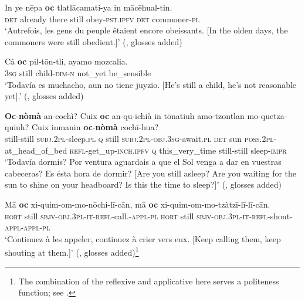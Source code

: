 \begin{exe}
	\ex\label{exAppendixClassicalNahuatl1}
	\gll In ye nēpa \textbf{oc} tlatlācamati-ya in mācēhual-tin.\\
	\textsc{det} already there still obey-\textsc{pst}.\textsc{ipfv} \textsc{det} commoner-\textsc{pl}\\
	\glt \lq Autrefois, les gens du peuple êtaient encore obeissants. [In the olden days, the commoners were still obedient.]\rq{ }(\cite[1262]{Launey1986}, glosses added)

	\ex\label{exAppendixClassicalNahuatl2}
	\gll Câ \textbf{oc} pil-tōn-tli, ayamo mozcalia.\\
	3\textsc{sg} still child-\textsc{dim}-\textsc{n} not\_yet be\_sensible\\
	\glt \lq Todavía es muchacho, aun no tiene juyzio. [He's still a child, he's not reasonable yet].' (\cite[501]{Carochi1645}, glosses added)

	\ex\label{exAppendixClassicalNahuatl3}
	\gll \textbf{Oc}-\textbf{nòmà} an-cochì? Cuix \textbf{oc} an-qu-ichià in tōnatiuh amo-tzontlan mo-quetza-quiuh? Cuix inmanin \textbf{oc}-\textbf{nòmà} cochī-hua?\\
	still-still \textsc{subj}.2\textsc{pl}-sleep.\textsc{pl} \textsc{q} still \textsc{subj}.2\textsc{pl}-\textsc{obj}.3\textsc{sg}-await.\textsc{pl} \textsc{det} sun \textsc{poss}.2\textsc{pl}-at\_head\_of\_bed \textsc{refl}-get\_up-\textsc{inch}.\textsc{ipfv} \textsc{q} this\_very\_time still-still sleep-\textsc{impr}\\
	\glt \lq Todavía dormis? Por ventura aguardais a que el Sol venga a dar en vuestras cabeceras? Es ésta hora de dormir? [Are you still asleep? Are you waiting for the sun to shine on your headboard? Is this the time to sleep?]ʼ (\cite[501]{Carochi1645}, glosses added)
	
	\ex\label{exAppendixClassicalNahuatl4}
	\gll Mā \textbf{oc} xi-quim-om-mo-nōchi-lī-cān, mā \textbf{oc} xi-quim-om-mo-tzàtzī-lī-lī-cān.\\
	\textsc{hort} still \textsc{sbjv}-\textsc{obj}.3\textsc{pl}-\textsc{it}-\textsc{refl}-call.-\textsc{appl}-\textsc{pl} \textsc{hort} still \textsc{sbjv}-\textsc{obj}.3\textsc{pl}-\textsc{it}-\textsc{refl}-shout-\textsc{appl}-\textsc{appl}-\textsc{pl}\\
	\glt \lq Continuez à les appeler, continuez à crier vers eux. [Keep calling them, keep shouting at them.]' (\cite[1262]{Launey1986}, glosses added)\footnote{The combination of the reflexive and applicative here serves a politeness function; see \textcite[ch. 21]{LauneyMackay2011}.}

\end{exe}

